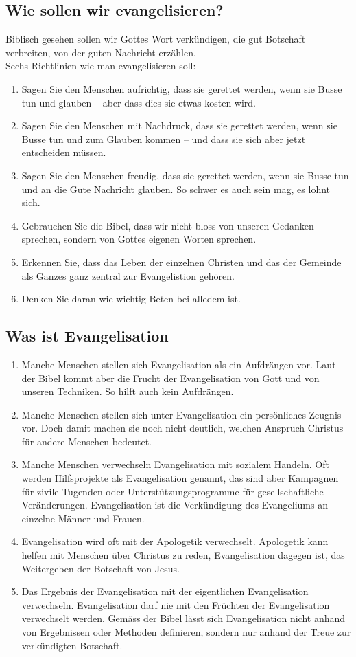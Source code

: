 \documentclass{../../inc/mybib}
\begin{document}
\subsection{Wie sollen wir evangelisieren? }
Biblisch gesehen sollen wir Gottes Wort verkündigen, die gut Botschaft verbreiten, von der guten Nachricht erzählen.\\
Sechs Richtlinien wie man evangelisieren soll:
\begin{enumerate}
    \item Sagen Sie den Menschen aufrichtig, dass sie gerettet werden, wenn sie Busse tun und glauben -- aber dass dies sie etwas kosten wird.
    \item Sagen Sie den Menschen mit Nachdruck, dass sie gerettet werden, wenn sie Busse tun und zum Glauben kommen -- und dass sie sich aber jetzt entscheiden müssen.
    \item Sagen Sie den Menschen freudig, dass sie gerettet werden, wenn sie Busse tun und an die Gute Nachricht glauben. So schwer es auch sein mag, es lohnt sich.
    \item Gebrauchen Sie die Bibel, dass wir nicht bloss von unseren Gedanken sprechen, sondern von Gottes eigenen Worten sprechen.
    \item Erkennen Sie, dass das Leben der einzelnen Christen und das der Gemeinde als Ganzes ganz zentral zur Evangelistion gehören.
    \item Denken Sie daran wie wichtig Beten bei alledem ist.
\end{enumerate}
\subsection{Was ist Evangelisation}
\begin{enumerate}
    \item Manche Menschen stellen sich Evangelisation als ein Aufdrängen vor. Laut der Bibel kommt aber die Frucht der Evangelisation von Gott und von unseren Techniken. So hilft auch kein Aufdrängen.
    \item Manche Menschen stellen sich unter Evangelisation ein persönliches Zeugnis vor. Doch damit machen sie noch nicht deutlich, welchen Anspruch Christus für andere Menschen bedeutet.
    \item Manche Menschen verwechseln Evangelisation mit sozialem Handeln. Oft werden Hilfsprojekte als Evangelisation genannt, das sind aber Kampagnen für zivile Tugenden oder Unterstützungsprogramme für gesellschaftliche Veränderungen. Evangelisation ist die Verkündigung des Evangeliums an einzelne Männer und Frauen.
    \item Evangelisation wird oft mit der Apologetik verwechselt. Apologetik kann helfen mit Menschen über Christus zu reden, Evangelisation dagegen ist, das Weitergeben der Botschaft von Jesus.
    \item Das Ergebnis der Evangelisation mit der eigentlichen Evangelisation verwechseln. Evangelisation darf nie mit den Früchten der Evangelisation verwechselt werden. Gemäss der Bibel lässt sich Evangelisation nicht anhand von Ergebnissen oder Methoden definieren, sondern nur anhand der Treue zur verkündigten Botschaft.
\end{enumerate}
\end{document}
